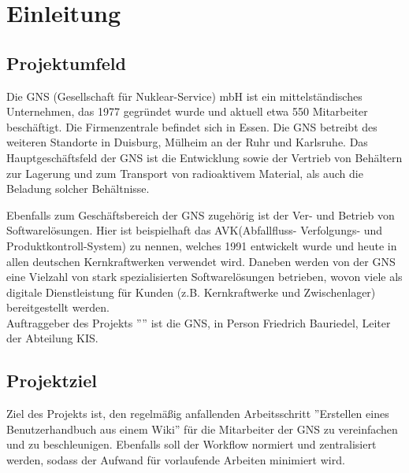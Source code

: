\documentclass[12pt, xcolor=dvipsnames]{scrartcl}
\begin{document}

\clearpage

\tableofcontents
\clearpage

\listoffigures
\clearpage

\listoftables
\clearpage

\printnomenclature		
\clearpage



\section{Einleitung}

\subsection{Projektumfeld}
\label{sec:projektumfeld}

Die GNS (Gesellschaft für Nuklear-Service) mbH ist ein mittelständisches Unternehmen, das 1977 gegründet wurde und aktuell etwa 550 Mitarbeiter beschäftigt. Die Firmenzentrale befindet sich in Essen. Die GNS betreibt des weiteren Standorte in Duisburg, Mülheim an der Ruhr und Karlsruhe. Das Hauptgeschäftsfeld der GNS ist die Entwicklung sowie der Vertrieb von Behältern zur Lagerung und zum Transport von radioaktivem Material, als auch die Beladung solcher Behältnisse.


Ebenfalls zum Geschäftsbereich der GNS zugehörig ist der Ver- und Betrieb von Softwarelösungen. Hier ist beispielhaft das AVK(Abfallfluss- Verfolgungs- und Produktkontroll-System) zu nennen, welches 1991 entwickelt wurde und heute in allen deutschen Kernkraftwerken verwendet wird.  Daneben werden von der GNS eine Vielzahl von stark spezialisierten Softwarelösungen betrieben, wovon viele als digitale Dienstleistung für Kunden (z.B. Kernkraftwerke und Zwischenlager) bereitgestellt werden. \\

Auftraggeber des Projekts ''\Projekt'' ist die GNS, in Person Friedrich Bauriedel, Leiter der Abteilung KIS.


\subsection{Projektziel}

Ziel des Projekts ist, den regelmäßig anfallenden Arbeitsschritt ''Erstellen eines Benutzerhandbuch aus einem Wiki'' für die Mitarbeiter der GNS zu vereinfachen und zu beschleunigen. Ebenfalls soll der Workflow normiert und zentralisiert werden, sodass der Aufwand für vorlaufende Arbeiten minimiert wird.
\end{document}
